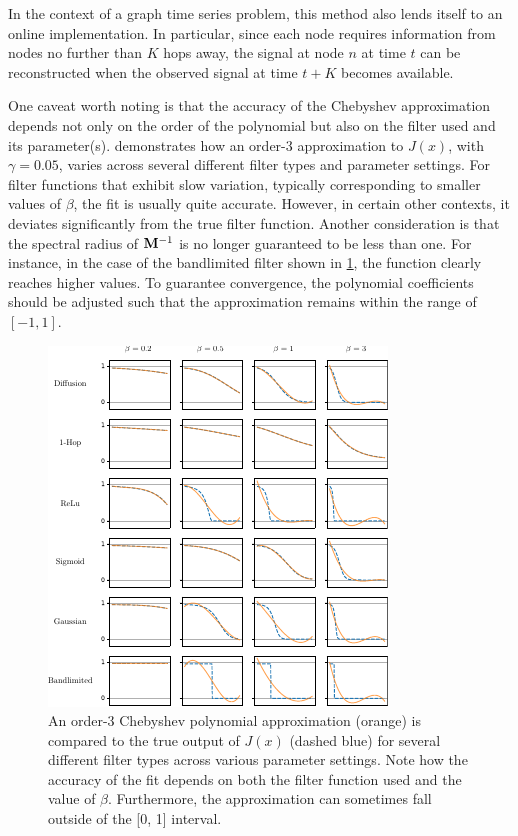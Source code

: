 In the context of a graph time series problem, this method also lends itself to an online implementation. In particular, since each node requires information from nodes no further than $K$ hops away, the signal at node $n$ at time $t$ can be reconstructed when the observed signal at time $t+K$ becomes available. 

One caveat worth noting is that the accuracy of the Chebyshev approximation depends not only on the order of the polynomial but also on the filter used and its parameter(s).  demonstrates how an order-3 approximation to $J(x)$, with $\gamma=0.05$, varies across several different filter types and parameter settings. For filter functions that exhibit slow variation, typically corresponding to smaller values of $\beta$, the fit is usually quite accurate. However, in certain other contexts, it deviates significantly from the true filter function. Another consideration is that the spectral radius of $\mathbf{M}^{-1}$ is no longer guaranteed to be less than one. For instance, in the case of the bandlimited filter shown in \cref{fig:cheb_approx}, the function clearly reaches higher values. To guarantee convergence, the polynomial coefficients should be adjusted such that the approximation remains within the range of $[-1, 1]$. 

\vspace{0.5cm}

\begin{figure}[t]
    \hspace{0.2cm}
        \includegraphics[width=0.9\linewidth]{Figures/cheb_approx.pdf}
    \caption[Chebyshev approximation accuracy visualisation]{\small{An order-3 Chebyshev polynomial approximation (orange) is compared to the true output of $J(x)$ (dashed blue) for several different filter types across various parameter settings. Note how the accuracy of the fit depends on both the filter function used and the value of $\beta$. Furthermore, the approximation can sometimes fall outside of the [0, 1] interval. }}
    \label{fig:cheb_approx}
\end{figure}


